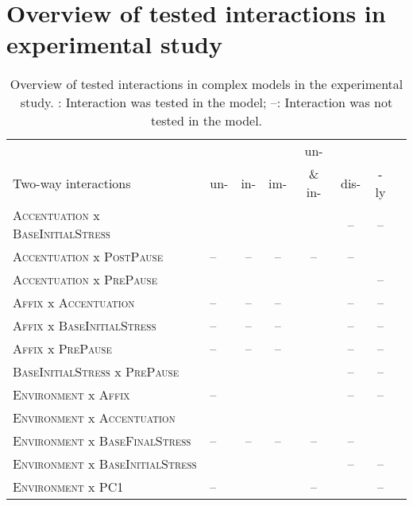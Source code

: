 


\chapter{Overview of tested interactions in experimental study}\label{Appendix G Summaries of tested interactions in experimental study}\largerpage[3]
\begin{table}\small
\caption{Overview of tested interactions in complex models in the experimental study. \checkmark: Interaction was tested in the model; --: Interaction was not tested in the model.\label{interactions experiments complex models}}
\begin{tabular}{llcccccc}\lsptoprule
	 & &&&{{un-}  }&  &\\
	{Two-way interactions} & {un-}&{in-}&{im-}&{\& {in-} }& {{dis-} }&{-ly}\\
	\midrule
	\textsc{Accentuation} x \textsc{BaseInitialStress}  &\checkmark &\checkmark&\checkmark&\checkmark&--&--\\		
	\textsc{Accentuation} x \textsc{PostPause}  &-- &--&--&--&--&\checkmark\\			
	\textsc{Accentuation} x \textsc{PrePause}  &\checkmark &\checkmark&\checkmark&\checkmark&\checkmark&--\\	
	\textsc{Affix} x \textsc{Accentuation}  &-- &--&--&\checkmark&--&--\\				
	\textsc{Affix} x \textsc{BaseInitialStress}  &-- &--&--&\checkmark&--&--\\				
	\textsc{Affix} x \textsc{PrePause}  &-- &--&--&\checkmark&--&--\\	
	\textsc{BaseInitialStress} x \textsc{PrePause}  &\checkmark &\checkmark&\checkmark&\checkmark&--&--\\	
	\textsc{Environment} x \textsc{Affix}  &-- &\checkmark&\checkmark&\checkmark&--&--\\
	\textsc{Environment} x \textsc{Accentuation}  &\checkmark&\checkmark&\checkmark&\checkmark&\checkmark&\checkmark\\
	\textsc{Environment} x \textsc{BaseFinalStress}  &-- &--&--&--&--&\checkmark\\		
	\textsc{Environment} x \textsc{BaseInitialStress}  &\checkmark &\checkmark&\checkmark&\checkmark&--&--\\
	\textsc{Environment} x \textsc{PC1}  &-- &\checkmark&\checkmark&--&\checkmark&--\\

\end{tabular}
\end{table}

